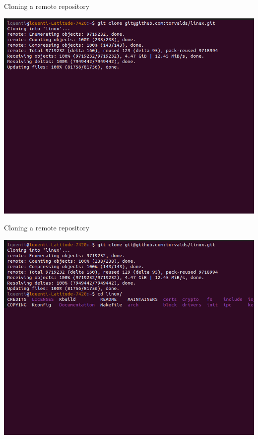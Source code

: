 \documentclass[compress,aspectratio=169]{beamer}
\begin{document}
  \begin{frame}{Cloning a remote repository}
    \begin{center}
      \includegraphics[height=0.85\textheight]{./assets/terminal_slideshows/04_clone_edit_01.png}
    \end{center}
  \end{frame}
  \begin{frame}[noframenumbering]{Cloning a remote repository}
    \begin{center}
      \includegraphics[height=0.85\textheight]{./assets/terminal_slideshows/04_clone_edit_02.png}
    \end{center}
  \end{frame}
\end{document}
